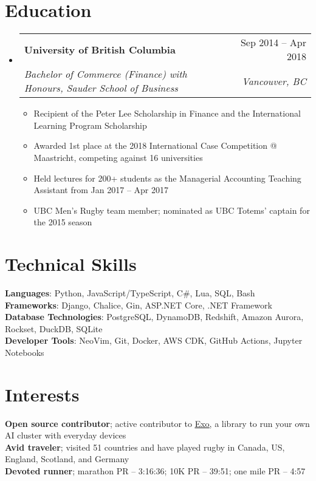 \documentclass[letterpaper,11pt]{article}
\makeatletter
\newcommand{\resumeItem}[1]{
  \item\small{
    {#1 \vspace{-2pt}}
  }
}
\newcommand{\resumeSubheading}[4]{
  \vspace{-2pt}\item
    \begin{tabular*}{0.97\textwidth}[t]{l@{\extracolsep{\fill}}r}
      \textbf{#1} & #2 \\
      \textit{\small#3} & \textit{\small #4} \\
    \end{tabular*}\vspace{-7pt}
}
\newcommand{\resumeSubHeadingListStart}{\begin{itemize}[leftmargin=0.15in, label={}]}
\newcommand{\resumeSubHeadingListEnd}{\end{itemize}}
\newcommand{\resumeItemListStart}{\begin{itemize}}
\newcommand{\resumeItemListEnd}{\end{itemize}\vspace{-5pt}}
\makeatother
\begin{document}
\section{Education}
  \resumeSubHeadingListStart
    \resumeSubheading
      {University of British Columbia}{Sep 2014 -- Apr 2018}
      {Bachelor of Commerce (Finance) with Honours, Sauder School of Business}{Vancouver, BC}
      \resumeItemListStart
        \resumeItem{Recipient of the Peter Lee Scholarship in Finance and the International Learning Program Scholarship}
        \resumeItem{Awarded 1st place at the 2018 International Case Competition @ Maastricht, competing against 16 universities}
        \resumeItem{Held lectures for 200+ students as the Managerial Accounting Teaching Assistant from Jan 2017 -- Apr 2017}
        \resumeItem{UBC Men's Rugby team member; nominated as UBC Totems' captain for the 2015 season}
      \resumeItemListEnd
  \resumeSubHeadingListEnd

\section{Technical Skills}
 \begin{itemize}[leftmargin=0.15in, label={}]
    \small{\item{
     \textbf{Languages}{: Python, JavaScript/TypeScript, C\#, Lua, SQL, Bash}\\
     \textbf{Frameworks}{: Django, Chalice, Gin, ASP.NET Core, .NET Framework}\\
     \textbf{Database Technologies}{: PostgreSQL, DynamoDB, Redshift, Amazon Aurora, Rockset, DuckDB, SQLite}\\
     \textbf{Developer Tools}{: NeoVim, Git, Docker, AWS CDK, GitHub Actions, Jupyter Notebooks}
    }}
 \end{itemize}

\section{Interests}
 \begin{itemize}[leftmargin=0.15in, label={}]
    \small{\item{
      \textbf{Open source contributor}{; active contributor to }\href{https://github.com/exo-explore/exo}{\underline{Exo}}{, a library to run your own AI cluster with everyday devices}\\
     \textbf{Avid traveler}{; visited 51 countries and have played rugby in Canada, US, England, Scotland, and Germany}\\
     \textbf{Devoted runner}{; marathon PR – 3:16:36; 10K PR – 39:51; one mile PR – 4:57}
    }}
 \end{itemize}
\end{document}
